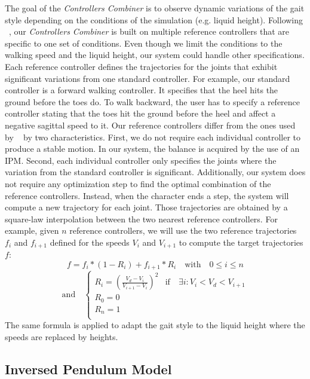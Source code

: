 \documentclass[runningheads,a4paper,10pt]{llncs}
\begin{document}
The goal of the \textit{Controllers Combiner} is to observe dynamic variations of the gait style depending on the conditions of the simulation (e.g. liquid height). Following ~\citep{coros2009robust}, our \textit{Controllers Combiner} is built on multiple reference controllers that are specific to one set of conditions. Even though we limit the conditions to the walking speed and the liquid height, our system could handle other specifications. Each reference controller defines the trajectories for the joints that exhibit significant variations from one standard controller. 
For example, our standard controller is a forward walking controller. It specifies that the heel hits the ground before the toes do. To walk backward, the user has to specify a reference controller stating that the toes hit the ground before the heel and affect a negative sagittal speed to it. Our reference controllers differ from the ones used by ~\citep{coros2009robust} by two characteristics. First, we do not require each individual controller to produce a stable motion. In our system, the balance is acquired by the use of an IPM. 
Second, each individual controller only specifies the joints where the variation from the standard controller is significant. Additionally, our system does not require any optimization step to find the optimal combination of the reference controllers. Instead, when the character ends a step, the system will compute a new trajectory for each joint. Those trajectories are obtained by a square-law interpolation between the two nearest reference controllers. 
For example, given $n$ reference controllers, we will use the two reference trajectories $f_i$ and $f_{i+1}$ defined for the speeds $V_i$ and $V_{i+1}$ to compute the target trajectories $f$: 
$$
f=f_i*(1-R_i)+f_{i+1}*R_i \quad \textrm{with} \quad 0\leq i \leq n
$$
$$
\textrm{and}\quad 
\begin{cases} 
R_i=\left( \frac{V_d-V_i}{V_{i+1}-V_i} \right) ^2   &\textrm{if} \quad   \exists i : V_i < V_d < V_{i+1}\\
R_0=0\\
R_n=1\\
\end{cases}
$$
The same formula is applied to adapt the gait style to the liquid height where the speeds are replaced by heights.

\subsection{Inversed Pendulum Model}
\label{sec:IPM}
\end{document}
